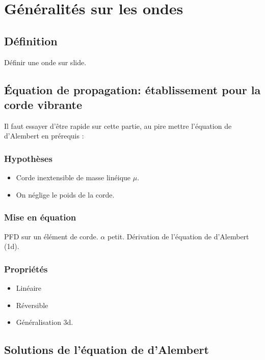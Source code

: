 \documentclass[11pt]{report}
\numberwithin{figure}{section}
\numberwithin{equation}{section}
\numberwithin{table}{section}
\newcommand{\1}{\boldsymbol{1}}
\begin{document}
\section{Généralités sur les ondes}

\subsection{Définition}

Définir une onde sur slide.

\subsection{Équation de propagation: établissement pour la corde vibrante}

\textcolor{mycolor5}{Il faut essayer d'être rapide sur cette partie, au pire mettre l'équation de d'Alembert en prérequis :}

\subsubsection{Hypothèses}
\begin{itemize}
\item Corde inextensible de masse linéique $\mu$.
\item On néglige le poids de la corde.
\end{itemize}

\subsubsection{Mise en équation}

PFD sur un élément de corde. $\alpha$ petit. Dérivation de l'équation de d'Alembert (1d).

\subsubsection{Propriétés}
\begin{itemize}
\item Linéaire
\item Réversible
\item Généralisation 3d.
\end{itemize}

\subsection{Solutions de l'équation de d'Alembert}
\end{document}
